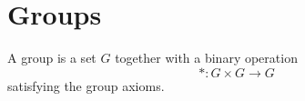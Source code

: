 \section{Groups}

A group is a set $G$ together with a binary operation
\[
*:G\times G\to G
\]
satisfying the group axioms.

